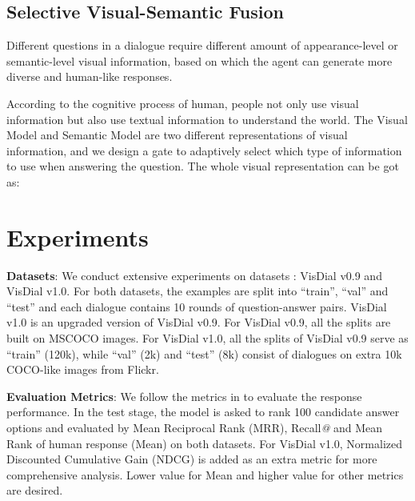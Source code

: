 \documentclass[letterpaper]{article} \usepackage{aaai20}  \usepackage{times}  \usepackage{helvet} \usepackage{courier}  \usepackage[hyphens]{url}  \usepackage{graphicx} \urlstyle{rm} \def\UrlFont{\rm}  \usepackage{graphicx}  \frenchspacing  \setlength{\pdfpagewidth}{8.5in}  \setlength{\pdfpageheight}{11in}  \usepackage{mathrsfs} \usepackage{amsfonts,amssymb}  \usepackage{tabularx} \usepackage{url}
\begin{document}
\subsection{Selective Visual-Semantic Fusion}

Different questions in a dialogue require different amount of appearance-level or semantic-level visual information, based on which the agent can generate more diverse and human-like responses. 

According to the cognitive process of human, people not only use visual information but also use textual information to understand the world. The Visual Model and Semantic Model are two different representations of visual information, and we design a gate to adaptively select which type of information to use when answering the question. The whole visual representation  can be got as:


\fi


\section{Experiments}
\label{sec:experiments}



\textbf{Datasets}: We conduct extensive experiments on datasets \cite{Das2017Visual}: VisDial v0.9 and VisDial v1.0. For both datasets, the examples are split into  ``train'', ``val'' and ``test'' and 
each dialogue contains 10 rounds of question-answer pairs. 
VisDial v1.0 is an upgraded version of VisDial v0.9. For VisDial v0.9, all the splits are built on MSCOCO images. 
For VisDial v1.0, all the splits of VisDial v0.9 serve as ``train'' (120k), while ``val'' (2k) and ``test'' (8k)  consist of dialogues on extra 10k COCO-like images from Flickr. 

\textbf{Evaluation Metrics}: We follow the metrics in \cite{Das2017Visual} to evaluate the response performance. In the test stage, the model is asked to rank 100 candidate answer options and evaluated by Mean Reciprocal Rank (MRR), Recall\textsl{@} and Mean Rank of human response (Mean) on both datasets. 
For VisDial v1.0, Normalized Discounted Cumulative Gain (NDCG) is added as an extra metric for more comprehensive analysis. Lower value for Mean and higher value for other metrics are desired.
\end{document}
